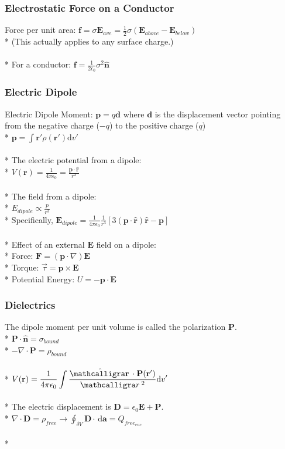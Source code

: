 \subsubsection{Electrostatic Force on a Conductor}
Force per unit area: \(\mathbf{f}=\sigma\mathbf{E}_{ave}=\frac{1}{2}\sigma(\mathbf{E}_{above}-\mathbf{E}_{below})\)\\*
(This actually applies to any surface charge.)\\\\*
For a conductor: \(\mathbf{f}=\frac{1}{2\epsilon_0}\sigma^2\hat{\mathbf{n}}\)

\subsubsection{Electric Dipole}
Electric Dipole Moment: \(\mathbf{p}=q\mathbf{d}\) where \(\mathbf{d}\) is the displacement vector pointing from the negative charge (\(-q\)) to the positive charge (\(q\))\\*
\(\displaystyle\mathbf{p}=\int{\mathbf{r'}\rho(\mathbf{r}')\mathrm{d}v'}\)\\\\*
The electric potential from a dipole:\\*
\(\displaystyle V(\mathbf{r})=\frac{1}{4\pi\epsilon_0}=\frac{\mathbf{p}\cdot\hat{\mathbf{r}}}{r^2}\)\\\\*
The field from a dipole:\\*
\(\displaystyle E_{dipole}\propto \frac{p}{r^3}\)\\*
Specifically, \(\displaystyle \mathbf{E}_{dipole}=\frac{1}{4\pi\epsilon_0}\frac{1}{r^3}\left[3\left(\mathbf{p}\cdot\hat{\mathbf{r}}\right)\hat{\mathbf{r}}-\mathbf{p}\right]\)\\\\*
Effect of an external \(\mathbf{E}\) field on a dipole:\\*
Force: \(\mathbf{F}=\left(\mathbf{p}\cdot\nabla\right)\mathbf{E}\)\\*
Torque: \(\vec{\tau}=\mathbf{p}\times\mathbf{E}\)\\*
Potential Energy: \(U=-\mathbf{p}\cdot\mathbf{E}\)

\subsubsection{Dielectrics}
The dipole moment per unit volume is called the polarization \(\mathbf{P}\).\\*
\(\mathbf{P}\cdot\hat{\mathbf{n}}=\sigma_{bound}\)\\*
\(-\nabla\cdot\mathbf{P}=\rho_{bound}\)\\\\*
\(\displaystyle V(\mathbf{r})=\frac{1}{4\pi\epsilon_0}\int{\frac{\hat{\mathbf{\scriptr}}\cdot\mathbf{P}(\mathbf{r}')}{\scriptr^2}\mathrm{d}v'}\)\\\\*
The electric displacement is \(\mathbf{D}=\epsilon_0\mathbf{E}+\mathbf{P}\).\\*
\(\nabla\cdot\mathbf{D}=\rho_{free}\to \displaystyle\oint_{\delta V}\mathbf{D}\cdot\,\mathrm{d}\mathbf{a}=Q_{free_{enc}}\)\\\\*

